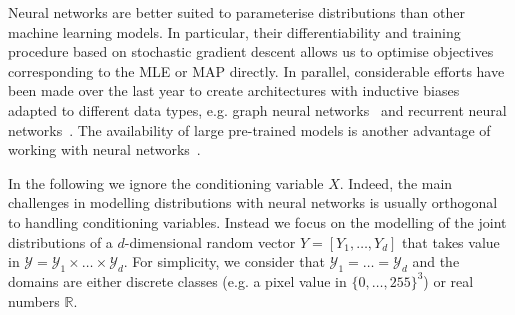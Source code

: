 Neural networks are better suited to parameterise distributions than other machine learning models. In particular, their differentiability and training procedure based on stochastic gradient descent allows us to optimise objectives corresponding to the MLE or MAP directly. In parallel, considerable efforts have been made over the last year to create architectures with inductive biases adapted to different data types, e.g. graph neural networks~\citep{xu2018powerful, satorras2021n} and recurrent neural networks~\citep{hochreiter1997long, cho2014properties}. The availability of large pre-trained models is another advantage of working with neural networks~\citep{bommasani2021opportunities}.

In the following we ignore the conditioning variable $X$. Indeed, the main challenges in modelling distributions with neural networks is usually orthogonal to handling conditioning variables. Instead we focus on the modelling of the joint distributions of a $d$-dimensional random vector $Y = \left[Y_1, \dots, Y_d  \right]$ that takes value in $\mathcal{Y} = \mathcal{Y}_1 \times \dots \times \mathcal{Y}_d$. For simplicity, we consider that $\mathcal{Y}_1 = \dots = \mathcal{Y}_d$ and the domains are either discrete classes (e.g. a pixel value in $\{0, \dots, 255\}^3$) or real numbers $\mathbb{R}$.
